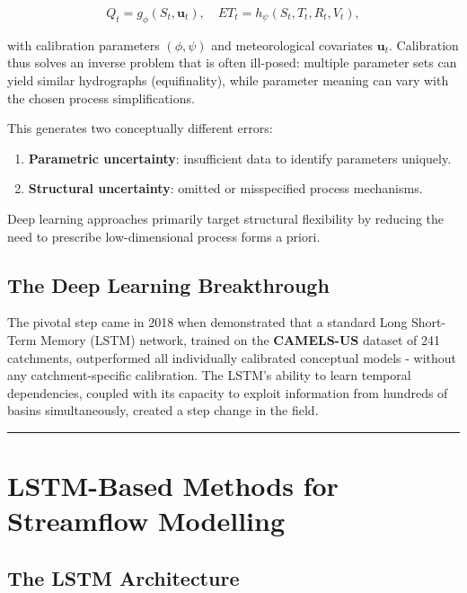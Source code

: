 \documentclass[
]{krantz}
\providecommand{\tightlist}{%
  \setlength{\itemsep}{0pt}\setlength{\parskip}{0pt}}
\begin{document}
\[
Q_t = g_\phi(S_t, \mathbf{u}_t), \quad ET_t = h_\psi(S_t, T_t, R_t, V_t),
\]

with calibration parameters \((\phi,\psi)\) and meteorological covariates \(\mathbf{u}_t\).
Calibration thus solves an inverse problem that is often ill-posed: multiple parameter
sets can yield similar hydrographs (equifinality), while parameter meaning can vary with
the chosen process simplifications.

This generates two conceptually different errors:

\begin{enumerate}
\def\labelenumi{\arabic{enumi}.}
\tightlist
\item
  \textbf{Parametric uncertainty}: insufficient data to identify parameters uniquely.
\item
  \textbf{Structural uncertainty}: omitted or misspecified process mechanisms.
\end{enumerate}

Deep learning approaches primarily target structural flexibility by reducing the need to
prescribe low-dimensional process forms a priori.

\subsection{The Deep Learning Breakthrough}\label{the-deep-learning-breakthrough}

The pivotal step came in 2018 when \citet{kratzert2018} demonstrated that a standard
Long Short-Term Memory (LSTM) network, trained on the
\textbf{CAMELS-US} dataset \citep{addor2017} of 241 catchments, outperformed all
individually calibrated conceptual models - without any catchment-specific calibration.
The LSTM's ability to learn temporal dependencies, coupled with its capacity to exploit
information from hundreds of basins simultaneously, created a step change in the field.

\begin{center}\rule{0.5\linewidth}{0.5pt}\end{center}

\section{LSTM-Based Methods for Streamflow Modelling}\label{nh-lstm-methods}

\subsection{The LSTM Architecture}\label{nh-lstm-arch}
\end{document}

